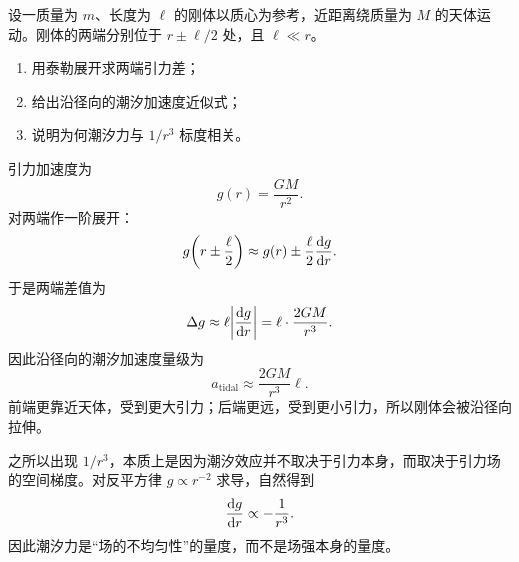 \begin{problem}
设一质量为 $m$、长度为 $\ell$ 的刚体以质心为参考，近距离绕质量为 $M$ 的天体运动。刚体的两端分别位于 $r\pm \ell/2$ 处，且 $\ell\ll r$。
\begin{enumerate}
  \item 用泰勒展开求两端引力差；
  \item 给出沿径向的潮汐加速度近似式；
  \item 说明为何潮汐力与 $1/r^3$ 标度相关。
\end{enumerate}
\begin{solution}
引力加速度为
\[
g(r)=\frac{GM}{r^2}.
\]
对两端作一阶展开：
\[
g\qty(r\pm \frac{\ell}{2})\approx g(r)\pm \frac{\ell}{2}\dv{g}{r}.
\]
于是两端差值为
\[
\Delta g\approx \ell\abs{\dv{g}{r}}=\ell\cdot \frac{2GM}{r^3}.
\]
因此沿径向的潮汐加速度量级为
\[
a_{\text{tidal}}\approx \frac{2GM}{r^3}\ell.
\]
前端更靠近天体，受到更大引力；后端更远，受到更小引力，所以刚体会被沿径向拉伸。

之所以出现 $1/r^3$，本质上是因为潮汐效应并不取决于引力本身，而取决于引力场的空间梯度。对反平方律 $g\propto r^{-2}$ 求导，自然得到
\[
\dv{g}{r}\propto -\frac{1}{r^3}.
\]
因此潮汐力是“场的不均匀性”的量度，而不是场强本身的量度。
\end{solution}
\end{problem}
